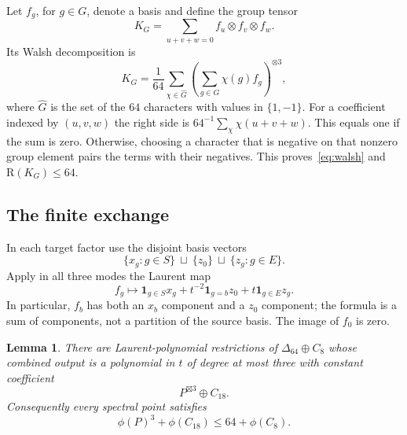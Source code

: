 \documentclass[10pt,a4paper]{article}
\newtheorem{lemma}[theorem]{Lemma}
\theoremstyle{definition}
\theoremstyle{remark}
\numberwithin{equation}{section}
\newcommand{\R}{\mathrm R}
\begin{document}
Let $f_g$, for $g\in G$, denote a basis and define the group tensor
\begin{equation}\label{eq:group-tensor}
 K_G=\sum_{u+v+w=0}f_u\otimes f_v\otimes f_w.
\end{equation}
Its Walsh decomposition is
\begin{equation}\label{eq:walsh}
 K_G=\frac1{64}\sum_{\chi\in\widehat G}
       \left(\sum_{g\in G}\chi(g)f_g\right)^{\otimes3},
\end{equation}
where $\widehat G$ is the set of the $64$ characters with values
in $\{1,-1\}$. For a coefficient indexed by $(u,v,w)$ the right
side is $64^{-1}\sum_\chi\chi(u+v+w)$. This equals one if the
sum is zero. Otherwise, choosing a character that is negative on
that nonzero group element pairs the terms with their negatives.
This proves~\eqref{eq:walsh} and $\R(K_G)\leq64$.

\subsection{The finite exchange}\label{sec:finite-exchange}

In each target factor use the disjoint basis vectors
\[
 \{x_g:g\in S\}\ \sqcup\ \{z_0\}\ \sqcup\ \{z_g:g\in E\}.
\]
Apply in all three modes the Laurent map
\begin{equation}\label{eq:laurent-map}
 f_g\longmapsto
 \boldsymbol1_{g\in S}x_g
 +t^{-2}\boldsymbol1_{g=b}z_0
 +t\boldsymbol1_{g\in E}z_g.
\end{equation}
In particular, $f_b$ has both an $x_b$ component and a $z_0$
component; the formula is a sum of components, not a partition of
the source basis. The image of $f_0$ is zero.

\begin{lemma}\label{lem:exchange}
There are Laurent-polynomial restrictions of $\Delta_{64}\oplus C_8$
whose combined output is a polynomial in $t$ of degree at most three
with constant coefficient
\begin{equation}\label{eq:exchange-target}
 P^{\boxtimes3}\oplus C_{18}.
\end{equation}
Consequently every spectral point satisfies
\begin{equation}\label{eq:exchange-spectral}
 \phi(P)^3+\phi(C_{18})\leq64+\phi(C_8).
\end{equation}
\end{lemma}
\end{document}
